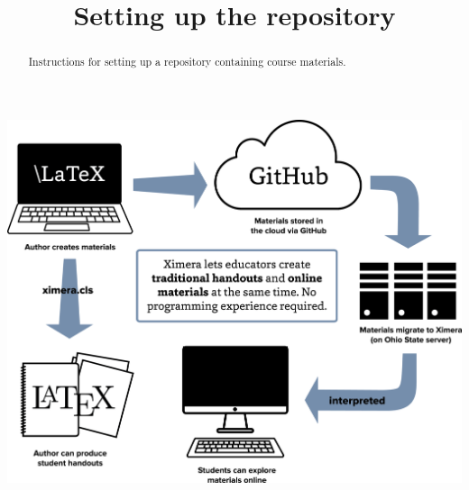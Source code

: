 \documentclass{ximera}
\title{Setting up the repository}
\begin{document}
\begin{abstract}
Instructions for setting up a repository containing course materials.
\end{abstract}
\maketitle

\begin{image}
\includegraphics{XimeraGraphic.png}
\end{image}
\end{document}
